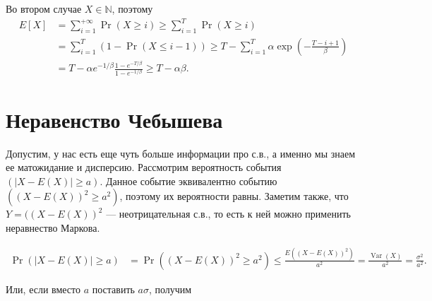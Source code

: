 \documentclass[12pt]{article}
\newcommand\N{\mathbb{N}}
\DeclareMathOperator{\Var}{Var}
\begin{document}
Во втором случае $X \in \N$, поэтому
\begin{align*}
  E[X] &= \sum_{i = 1}^{+\infty} \Pr(X \ge i) \ge \sum_{i = 1}^{T} \Pr(X \ge i) \\
       &= \sum_{i = 1}^T (1 - \Pr(X \le i - 1)) \ge T - \sum_{i = 1}^{T} \alpha\exp\left(-\frac{T - i + 1}{\beta}\right) \\
       &= T - \alpha e^{-1/\beta} \frac{1 - e^{-T/\beta}}{1 - e^{-1/\beta}} \ge T - \alpha\beta. 
\end{align*}

\section{Неравенство Чебышева}

Допустим, у нас есть еще чуть больше информации про с.в., а именно мы знаем ее матожидание и дисперсию. Рассмотрим вероятность события $(|X - E(X)| \ge a)$. Данное событие эквивалентно событию $((X - E(X))^2 \ge a^2)$, поэтому их вероятности равны. Заметим также, что $Y = ((X - E(X))^2$ --- неотрицательная с.в., то есть к ней можно применить неравнество Маркова.

\begin{align*}
  \Pr(|X - E(X)| \ge a) &= \Pr((X - E(X))^2 \ge a^2) \le \frac{E((X - E(X))^2)}{a^2} = \frac{\Var(X)}{a^2} = \frac{\sigma^2}{a^2}.
\end{align*}

\begin{center}
\end{center}

Или, если вместо $a$ поставить $a\sigma$, получим


\begin{center}
\end{center}
\end{document}
